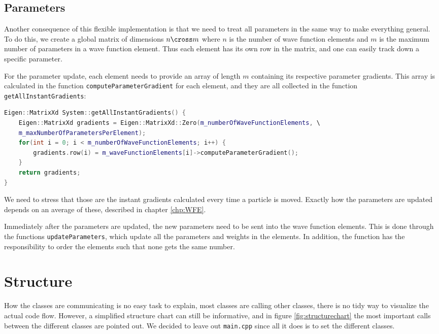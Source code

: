 \subsection{Parameters}
Another consequence of this flexible implementation is that we need to treat all parameters in the same way to make everything general. To do this, we create a global matrix of dimensions $n \cross m$ where $n$ is the number of wave function elements and $m$ is the maximum number of parameters in a wave function element. Thus each element has its own row in the matrix, and one can easily track down a specific parameter. 

For the parameter update, each element needs to provide an array of length $m$ containing its respective parameter gradients. This array is calculated in the function \newline \texttt{computeParameterGradient} for each element, and they are all collected in the function \texttt{getAllInstantGradients}:

\lstset{basicstyle=\scriptsize}
\begin{lstlisting}[language=c++,caption={from \texttt{system.cpp}}]
Eigen::MatrixXd System::getAllInstantGradients() {
    Eigen::MatrixXd gradients = Eigen::MatrixXd::Zero(m_numberOfWaveFunctionElements, \
    m_maxNumberOfParametersPerElement);
    for(int i = 0; i < m_numberOfWaveFunctionElements; i++) {
        gradients.row(i) = m_waveFunctionElements[i]->computeParameterGradient();
    }
    return gradients;
}
\end{lstlisting}
We need to stress that those are the instant gradients calculated every time a particle is moved. Exactly how the parameters are updated depends on an average of these, described in chapter \ref{chp:WFE}. 

Immediately after the parameters are updated, the new parameters need to be sent into the wave function elements. This is done through the functions \texttt{updateParameters}, which update all the parameters and weights in the elements. In addition, the function has the responsibility to order the elements such that none gets the same number. 


\section{Structure} \label{subsec:structure}
How the classes are communicating is no easy task to explain, most classes are calling other classes, there is no tidy way to visualize the actual code flow. However, a simplified structure chart can still be informative, and in figure \eqref{fig:structurechart} the most important calls between the different classes are pointed out. We decided to leave out \texttt{main.cpp} since all it does is to set the different classes. 

